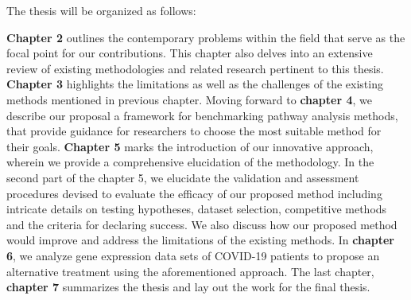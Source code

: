 The thesis will be organized as follows:

\textbf{Chapter 2}  outlines the contemporary problems within the field that serve as the focal point for our contributions. This chapter also delves into an extensive review of existing methodologies and related research pertinent to this thesis.
\textbf{Chapter 3} highlights the limitations as well as the challenges of the existing methods mentioned in previous chapter.
Moving forward to \textbf{chapter 4}, we describe our proposal a framework for benchmarking pathway analysis methods, that provide guidance for researchers to choose the most suitable method for their goals. \textbf{Chapter 5} marks the introduction of our innovative approach, wherein we provide a comprehensive elucidation of the methodology. In the second part of the chapter 5, we elucidate the validation and assessment procedures devised to evaluate the efficacy of our proposed method including intricate details on testing hypotheses, dataset selection, competitive methods and the criteria for declaring success. We also discuss how our proposed method would improve and address the limitations of the existing methods.
In \textbf{chapter 6}, we analyze gene expression data sets of COVID-19 patients to propose an alternative treatment using the aforementioned approach.
The last chapter, \textbf{chapter 7} summarizes the thesis and lay out the work for the final thesis.


%
%



